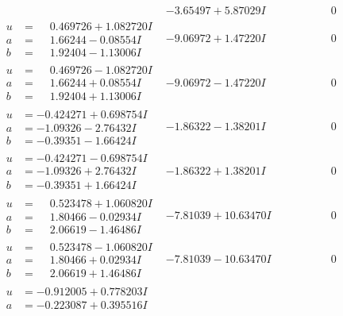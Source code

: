 \documentclass[1p]{elsarticle_modified}
\theoremstyle{definition}
\begin{document}
$$\begin{array}{c|c|c}
 & -3.65497 + 5.87029 I & \phantom{-0.000000 } 0 \\ \hline\begin{aligned}
u &= \phantom{-}0.469726 + 1.082720 I \\
a &= \phantom{-}1.66244 - 0.08554 I \\
b &= \phantom{-}1.92404 - 1.13006 I\end{aligned}
 & -9.06972 + 1.47220 I & \phantom{-0.000000 } 0 \\ \hline\begin{aligned}
u &= \phantom{-}0.469726 - 1.082720 I \\
a &= \phantom{-}1.66244 + 0.08554 I \\
b &= \phantom{-}1.92404 + 1.13006 I\end{aligned}
 & -9.06972 - 1.47220 I & \phantom{-0.000000 } 0 \\ \hline\begin{aligned}
u &= -0.424271 + 0.698754 I \\
a &= -1.09326 - 2.76432 I \\
b &= -0.39351 - 1.66424 I\end{aligned}
 & -1.86322 - 1.38201 I & \phantom{-0.000000 } 0 \\ \hline\begin{aligned}
u &= -0.424271 - 0.698754 I \\
a &= -1.09326 + 2.76432 I \\
b &= -0.39351 + 1.66424 I\end{aligned}
 & -1.86322 + 1.38201 I & \phantom{-0.000000 } 0 \\ \hline\begin{aligned}
u &= \phantom{-}0.523478 + 1.060820 I \\
a &= \phantom{-}1.80466 - 0.02934 I \\
b &= \phantom{-}2.06619 - 1.46486 I\end{aligned}
 & -7.81039 + 10.63470 I & \phantom{-0.000000 } 0 \\ \hline\begin{aligned}
u &= \phantom{-}0.523478 - 1.060820 I \\
a &= \phantom{-}1.80466 + 0.02934 I \\
b &= \phantom{-}2.06619 + 1.46486 I\end{aligned}
 & -7.81039 - 10.63470 I & \phantom{-0.000000 } 0 \\ \hline\begin{aligned}
u &= -0.912005 + 0.778203 I \\
a &= -0.223087 + 0.395516 I \\

\end{aligned}
\end{array}$$
\end{document}
